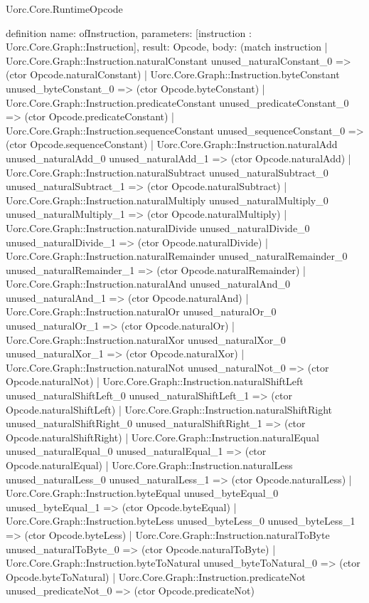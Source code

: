 \begin{lexlean}{Uorc.Core.RuntimeOpcode}
\begin{semanticmodule}
definition{
  name: ofInstruction,
  parameters: [instruction : Uorc.Core.Graph::Instruction],
  result: Opcode,
  body: (match instruction
    | Uorc.Core.Graph::Instruction.naturalConstant unused_naturalConstant_0 => (ctor Opcode.naturalConstant)
    | Uorc.Core.Graph::Instruction.byteConstant unused_byteConstant_0 => (ctor Opcode.byteConstant)
    | Uorc.Core.Graph::Instruction.predicateConstant unused_predicateConstant_0 => (ctor Opcode.predicateConstant)
    | Uorc.Core.Graph::Instruction.sequenceConstant unused_sequenceConstant_0 => (ctor Opcode.sequenceConstant)
    | Uorc.Core.Graph::Instruction.naturalAdd unused_naturalAdd_0 unused_naturalAdd_1 => (ctor Opcode.naturalAdd)
    | Uorc.Core.Graph::Instruction.naturalSubtract unused_naturalSubtract_0 unused_naturalSubtract_1 => (ctor Opcode.naturalSubtract)
    | Uorc.Core.Graph::Instruction.naturalMultiply unused_naturalMultiply_0 unused_naturalMultiply_1 => (ctor Opcode.naturalMultiply)
    | Uorc.Core.Graph::Instruction.naturalDivide unused_naturalDivide_0 unused_naturalDivide_1 => (ctor Opcode.naturalDivide)
    | Uorc.Core.Graph::Instruction.naturalRemainder unused_naturalRemainder_0 unused_naturalRemainder_1 => (ctor Opcode.naturalRemainder)
    | Uorc.Core.Graph::Instruction.naturalAnd unused_naturalAnd_0 unused_naturalAnd_1 => (ctor Opcode.naturalAnd)
    | Uorc.Core.Graph::Instruction.naturalOr unused_naturalOr_0 unused_naturalOr_1 => (ctor Opcode.naturalOr)
    | Uorc.Core.Graph::Instruction.naturalXor unused_naturalXor_0 unused_naturalXor_1 => (ctor Opcode.naturalXor)
    | Uorc.Core.Graph::Instruction.naturalNot unused_naturalNot_0 => (ctor Opcode.naturalNot)
    | Uorc.Core.Graph::Instruction.naturalShiftLeft unused_naturalShiftLeft_0 unused_naturalShiftLeft_1 => (ctor Opcode.naturalShiftLeft)
    | Uorc.Core.Graph::Instruction.naturalShiftRight unused_naturalShiftRight_0 unused_naturalShiftRight_1 => (ctor Opcode.naturalShiftRight)
    | Uorc.Core.Graph::Instruction.naturalEqual unused_naturalEqual_0 unused_naturalEqual_1 => (ctor Opcode.naturalEqual)
    | Uorc.Core.Graph::Instruction.naturalLess unused_naturalLess_0 unused_naturalLess_1 => (ctor Opcode.naturalLess)
    | Uorc.Core.Graph::Instruction.byteEqual unused_byteEqual_0 unused_byteEqual_1 => (ctor Opcode.byteEqual)
    | Uorc.Core.Graph::Instruction.byteLess unused_byteLess_0 unused_byteLess_1 => (ctor Opcode.byteLess)
    | Uorc.Core.Graph::Instruction.naturalToByte unused_naturalToByte_0 => (ctor Opcode.naturalToByte)
    | Uorc.Core.Graph::Instruction.byteToNatural unused_byteToNatural_0 => (ctor Opcode.byteToNatural)
    | Uorc.Core.Graph::Instruction.predicateNot unused_predicateNot_0 => (ctor Opcode.predicateNot)
}
\end{semanticmodule}
\end{lexlean}
